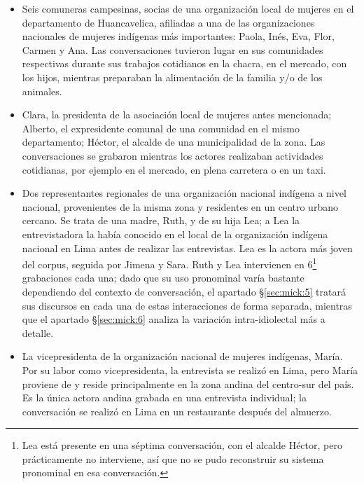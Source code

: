\documentclass[output=paper]{../langscibook}
\begin{document}
\begin{itemize}
\item Seis comuneras campesinas, socias de una organización local de mujeres en el departamento de Huancavelica, afiliadas a una de las organizaciones nacionales de mujeres indígenas más importantes: Paola, Inés, Eva, Flor, Carmen y Ana. Las conversaciones tuvieron lugar en sus comunidades respectivas durante sus trabajos cotidianos en la chacra, en el mercado, con los hijos, mientras preparaban la alimentación de la familia y/o de los animales.
\item Clara, la presidenta de la asociación local de mujeres antes mencionada; Alberto, el expresidente comunal de una comunidad en el mismo departamento; Héctor, el alcalde de una municipalidad de la zona. Las conversaciones se grabaron mientras los actores realizaban actividades cotidianas, por ejemplo en el mercado, en plena carretera o en un taxi.
\item Dos representantes regionales de una organización nacional indígena a nivel nacional, provenientes de la misma zona y residentes en un centro urbano cercano. Se trata de una madre, Ruth, y de su hija Lea; a Lea la entrevistadora la había conocido en el local de la organización indígena nacional en Lima antes de realizar las entrevistas. Lea es la actora más joven del corpus, seguida por Jimena y Sara. Ruth y Lea intervienen en 6\footnote{Lea está presente en una séptima conversación, con el alcalde Héctor, pero prácticamente no interviene, así que no se pudo reconstruir su sistema pronominal en esa conversación.}  grabaciones cada una; dado que su uso pronominal varía bastante dependiendo del contexto de conversación, el apartado §\ref{sec:mick:5} tratará sus discursos en cada una de estas interacciones de forma separada, mientras que el apartado §\ref{sec:mick:6} analiza la variación intra-idiolectal más a detalle.
\item La vicepresidenta de la organización nacional de mujeres indígenas, María. Por su labor como vicepresidenta, la entrevista se realizó en Lima, pero María proviene de y reside principalmente en la zona andina del centro-sur del país. Es la única actora andina grabada en una entrevista individual; la conversación se realizó en Lima en un restaurante después del almuerzo.
\end{itemize}
\end{document}
